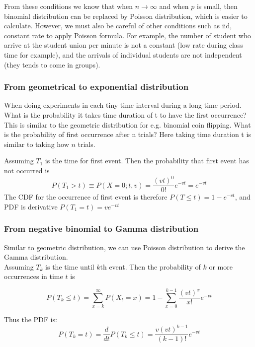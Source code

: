 \documentclass[11pt]{article}
\begin{document}
From these conditions we know that when \(n\rightarrow \infty\) and when
\(p\) is small, then binomial distribution can be replaced by Poisson
distribution, which is easier to calculate. However, we must also be
careful of other conditions such as iid, constant rate to apply Poisson
formula. For example, the number of student who arrive at the student
union per minute is not a constant (low rate during class time for
example), and the arrivals of individual students are not independent
(they tends to come in groups).

    \subsubsection{From geometrical to exponential
distribution}\label{from-geometrical-to-exponential-distribution}

When doing experiments in each tiny time interval during a long time
period. What is the probability it takes time duration of t to have the
first occurrence? This is similar to the geometric distribution for e.g.
binomial coin flipping. What is the probability of first occurrence
after n trials? Here taking time duration t is similar to taking how
\(n\) trials.

Assuming \(T_1\) is the time for first event. Then the probability that
first event has not occurred is\\
\[ P(T_1 > t) \equiv P(X = 0; t, v) = \frac{(vt)^0}{0!}e^{-vt}= e^{-vt}\]
The CDF for the occurrence of first event is therefore
\(P(T\leq t ) = 1-e^{-vt}\), and PDF is derivative
\(P(T_1 = t) = ve^{-vt}\)

    \subsubsection{From negative binomial to Gamma
distribution}\label{from-negative-binomial-to-gamma-distribution}

Similar to geometric distribution, we can use Poisson distribution to
derive the Gamma distribution.\\
Assuming \(T_k\) is the time until \(k\)th event. Then the probability
of \(k\) or more occurrences in time \(t\) is

\[ P(T_k \leq t) = \sum_{x=k}^\infty P(X_t = x) = 1 - \sum_{x=0}^{k-1}\frac{(vt)^x}{x!}e^{-vt}\]

Thus the PDF is:\\
\[ P(T_k = t) = \frac{d}{dt}P(T_k \leq t) = \frac{v(vt)^{k-1}}{(k-1)!}e^{-vt}\]
\end{document}
